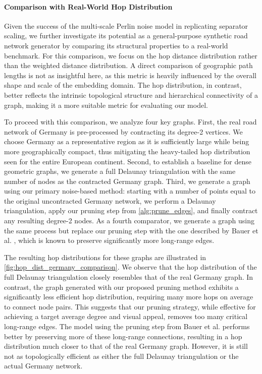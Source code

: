 \paragraph{Comparison with Real-World Hop Distribution}

Given the success of the multi-scale Perlin noise model in replicating separator scaling, we further investigate its potential as a general-purpose synthetic road network generator by comparing its structural properties to a real-world benchmark.
For this comparison, we focus on the hop distance distribution rather than the weighted distance distribution.
A direct comparison of geographic path lengths is not as insightful here, as this metric is heavily influenced by the overall shape and scale of the embedding domain.
The hop distribution, in contrast, better reflects the intrinsic topological structure and hierarchical connectivity of a graph, making it a more suitable metric for evaluating our model.

To proceed with this comparison, we analyze four key graphs.
First, the real road network of Germany is pre-processed by contracting its degree-2 vertices.
We choose Germany as a representative region as it is sufficiently large while being more geographically compact, thus mitigating the heavy-tailed hop distribution seen for the entire European continent.
Second, to establish a baseline for dense geometric graphs, we generate a full Delaunay triangulation with the same number of nodes as the contracted Germany graph.
Third, we generate a graph using our primary noise-based method: starting with a number of points equal to the original uncontracted Germany network, we perform a Delaunay triangulation, apply our pruning step from \cref{alg:prune_edges}, and finally contract any resulting degree-2 nodes.
As a fourth comparator, we generate a graph using the same process but replace our pruning step with the one described by Bauer et al. \cite{hutchison_synthetic_2010}, which is known to preserve significantly more long-range edges.

The resulting hop distributions for these graphs are illustrated in \cref{fig:hop_dist_germany_comparison}.
We observe that the hop distribution of the full Delaunay triangulation closely resembles that of the real Germany graph.
In contrast, the graph generated with our proposed pruning method exhibits a significantly less efficient hop distribution, requiring many more hops on average to connect node pairs.
This suggests that our pruning strategy, while effective for achieving a target average degree and visual appeal, removes too many critical long-range edges.
The model using the pruning step from Bauer et al. performs better by preserving more of these long-range connections, resulting in a hop distribution much closer to that of the real Germany graph.
However, it is still not as topologically efficient as either the full Delaunay triangulation or the actual Germany network.

